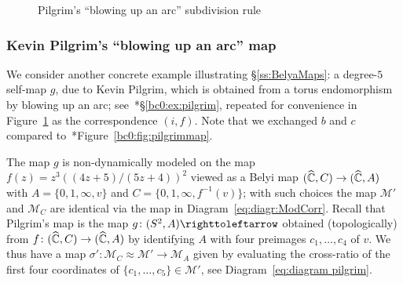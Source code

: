 \documentclass{amsart}
\begin{document}
\begin{figure}
\begin{center}
\end{center}
\caption{Pilgrim's ``blowing up an arc'' subdivision rule}\label{fig:pilgrimmap}
\end{figure}

\subsubsection{Kevin Pilgrim's ``blowing up an arc'' map}\label{ss:pilgrim}
We consider another concrete example illustrating
\S\ref{ss:BelyaMaps}: a degree-$5$ self-map $g$, due to Kevin Pilgrim,
which is obtained from a torus endomorphism by blowing up an arc;
see~\cite{bartholdi-dudko:bc0}*{\S\ref{bc0:ex:pilgrim}}, repeated for
convenience in Figure~\ref{fig:pilgrimmap} as the correspondence
$(i,f)$. Note that we exchanged $b$ and $c$ compared
to~\cite{bartholdi-dudko:bc0}*{Figure~\ref{bc0:fig:pilgrimmap}}.

The map $g$ is non-dynamically modeled on the map
$f(z)=z^3((4z+5)/(5z+4))^2$ viewed as a Belyi map $({\widehat{{\mathbb C}}},C)\to ({\widehat{{\mathbb C}}},A)$
with $A=\{0,1,\infty,v\}$ and $C=\{0,1,\infty, f^{-1}(v)\}$; with such
choices the map $\mathscr M'$ and $\mathscr M_C$ are identical via the
map in Diagram~\eqref{eq:diagr:ModCorr}. Recall that Pilgrim's map is
the map $g\colon(S^2,A)\selfmap$ obtained (topologically) from
$f\colon({\widehat{{\mathbb C}}},C)\to({\widehat{{\mathbb C}}},A)$ by identifying $A$ with four preimages
$c_1,\dots,c_4$ of $v$. We thus have a map $\sigma'\colon\mathscr
M_C\approx \mathscr M'\to \mathscr M_A$ given by evaluating the
cross-ratio of the first four coordinates of $\{c_1,\dots,c_5\}\in
\mathscr M'$, see Diagram~\eqref{eq:diagram pilgrim}.
\end{document}
